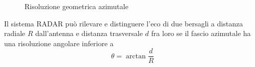 {
}
\begin{figure}[ht!]\centering
{}\quad{}
\caption{Risoluzione geometrica azimutale}
\end{figure}

Il sistema \ac{RADAR} può rilevare e distinguere l'eco di due bersagli a distanza radiale $R$ dall'antenna e distanza trasversale $d$ fra loro se il fascio azimutale ha una risoluzione angolare inferiore a 
\begin{equation}
\theta=\arctan\frac{d}{R}
\end{equation}

